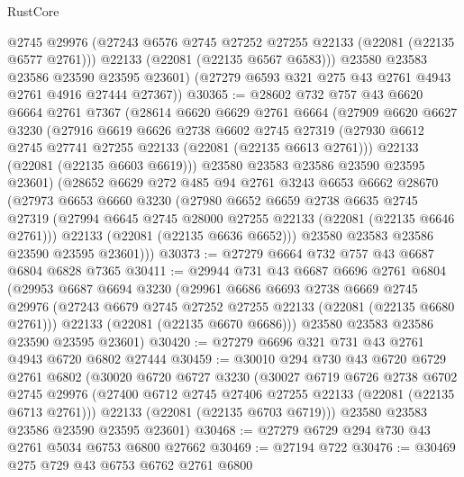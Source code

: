 \begin{lexlean}{RustCore}
\begin{coremodule}
          @2745
          @29976
          (@27243 @6576 @2745 @27252 @27255 @22133 (@22081 (@22135 @6577 @2761)))
          @22133
          (@22081 (@22135 @6567 @6583)))
        @23580
        @23583
        @23586
        @23590
        @23595
        @23601)
      (@27279 @6593 @321 @275 @43 @2761 @4943 @2761 @4916 @27444 @27367))
@30365 := @28602
    @732
    @757
    @43
    @6620
    @6664
    @2761
    @7367
    (@28614
      @6620
      @6629
      @2761
      @6664
      (@27909
        @6620
        @6627
        @3230
        (@27916
          @6619
          @6626
          @2738
          @6602
          @2745
          @27319
          (@27930 @6612 @2745 @27741 @27255 @22133 (@22081 (@22135 @6613 @2761)))
          @22133
          (@22081 (@22135 @6603 @6619)))
        @23580
        @23583
        @23586
        @23590
        @23595
        @23601)
      (@28652
        @6629
        @272
        @485
        @94
        @2761
        @3243
        @6653
        @6662
        @28670
        (@27973
          @6653
          @6660
          @3230
          (@27980
            @6652
            @6659
            @2738
            @6635
            @2745
            @27319
            (@27994 @6645 @2745 @28000 @27255 @22133 (@22081 (@22135 @6646 @2761)))
            @22133
            (@22081 (@22135 @6636 @6652)))
          @23580
          @23583
          @23586
          @23590
          @23595
          @23601)))
@30373 := @27279 @6664 @732 @757 @43 @6687 @6804 @6828 @7365
@30411 := @29944
    @731
    @43
    @6687
    @6696
    @2761
    @6804
    (@29953
      @6687
      @6694
      @3230
      (@29961
        @6686
        @6693
        @2738
        @6669
        @2745
        @29976
        (@27243 @6679 @2745 @27252 @27255 @22133 (@22081 (@22135 @6680 @2761)))
        @22133
        (@22081 (@22135 @6670 @6686)))
      @23580
      @23583
      @23586
      @23590
      @23595
      @23601)
@30420 := @27279 @6696 @321 @731 @43 @2761 @4943 @6720 @6802 @27444
@30459 := @30010
    @294
    @730
    @43
    @6720
    @6729
    @2761
    @6802
    (@30020
      @6720
      @6727
      @3230
      (@30027
        @6719
        @6726
        @2738
        @6702
        @2745
        @29976
        (@27400 @6712 @2745 @27406 @27255 @22133 (@22081 (@22135 @6713 @2761)))
        @22133
        (@22081 (@22135 @6703 @6719)))
      @23580
      @23583
      @23586
      @23590
      @23595
      @23601)
@30468 := @27279 @6729 @294 @730 @43 @2761 @5034 @6753 @6800 @27662
@30469 := @27194 @722
@30476 := @30469 @275 @729 @43 @6753 @6762 @2761 @6800

\end{coremodule}
\end{lexlean}
